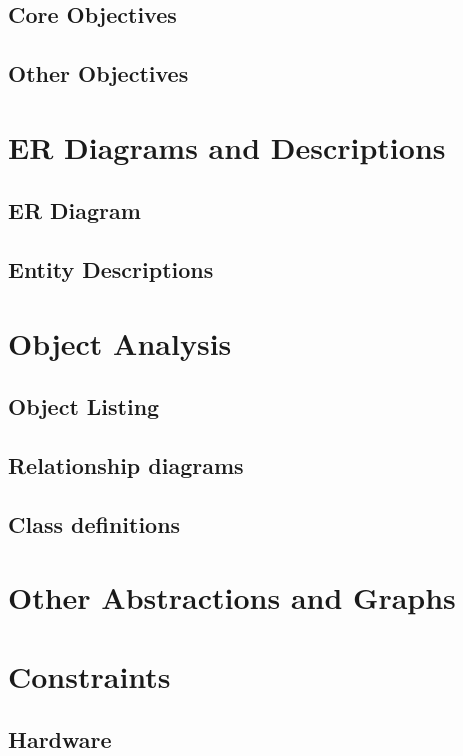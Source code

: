 \begin{algorithm}[H]
\begin{algorithmic}[H]
\subsection{Core Objectives}

\subsection{Other Objectives}

\section{ER Diagrams and Descriptions}

\subsection{ER Diagram}

\subsection{Entity Descriptions}

\section{Object Analysis}

\subsection{Object Listing}

\subsection{Relationship diagrams}

\subsection{Class definitions}

\section{Other Abstractions and Graphs}

\section{Constraints}

\subsection{Hardware}


\end{algorithmic}
\end{algorithm}
